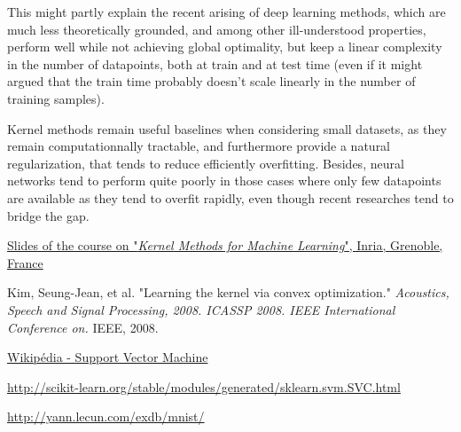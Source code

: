 \documentclass[a4paper, 11pt]{article}
\begin{document}
This might partly explain the recent arising of deep learning methods, which
are much less theoretically grounded, and among other ill-understood properties,
perform well while not achieving global optimality, but keep a linear complexity
in the number of datapoints, both at train and at test time (even if it might argued
that the train time probably doesn't scale linearly in the number of training samples).

Kernel methods remain useful baselines when considering small datasets, as
they remain computationnally tractable, and furthermore
provide a natural regularization, that tends to reduce efficiently overfitting.
Besides, neural networks tend to perform quite poorly in those cases where only 
few datapoints are available as they tend to overfit rapidly, even though recent
researches tend to bridge the gap.

\begin{thebibliography}{1}

 \href{http://lear.inrialpes.fr/people/mairal/teaching/2015-2016/MVA/fichiers/mva_slides.pdf}{Slides of the course on "{\it Kernel Methods for Machine Learning}", Inria, Grenoble, France}

 Kim, Seung-Jean, et al. "Learning the kernel via convex optimization." {\it Acoustics, Speech and Signal Processing, 2008. ICASSP 2008. IEEE International Conference on.} IEEE, 2008.

 \href{https://en.wikipedia.org/wiki/Support_vector_machine}{Wikip\'edia - Support Vector Machine}

 \href{Library {\it sklearn} for Machine Learning in Python. Functions on SVM/SVC.}{http://scikit-learn.org/stable/modules/generated/sklearn.svm.SVC.html}

 \href{The MNIST Databse of handwritten digits. (Website of Yann Lecun)}{http://yann.lecun.com/exdb/mnist/}

\end{thebibliography}
\end{document}
